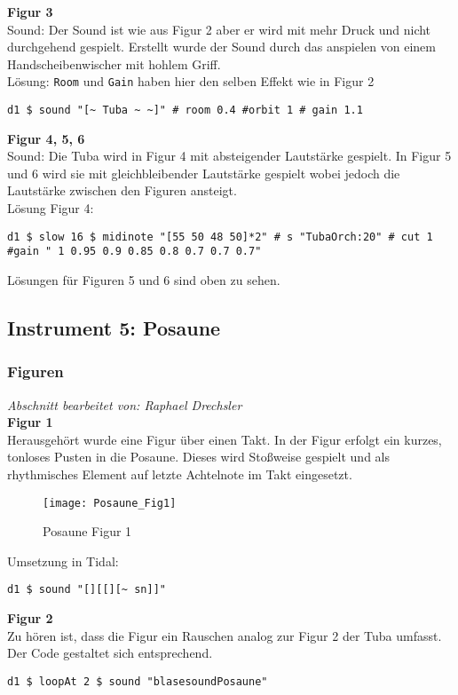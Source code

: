 \documentclass[
10pt, %
a4paper, %
oneside, %
headinclude,footinclude, %
BCOR5mm, %
]{scrartcl}
\begin{document}
\noindent\textbf{Figur 3}\\
Sound: Der Sound ist wie aus Figur 2 aber er wird mit mehr Druck und nicht durchgehend gespielt. Erstellt wurde der Sound durch das anspielen von einem Handscheibenwischer mit hohlem Griff.\\
Lösung: \verb|Room| und \verb|Gain| haben hier den selben Effekt wie in Figur 2
\begin{lstlisting}
d1 $ sound "[~ Tuba ~ ~]" # room 0.4 #orbit 1 # gain 1.1
\end{lstlisting}
\noindent\textbf{Figur 4, 5, 6}\\
Sound: Die Tuba wird in Figur 4 mit absteigender Lautstärke gespielt. In Figur 5 und 6 wird sie mit gleichbleibender Lautstärke gespielt wobei jedoch die Lautstärke
zwischen den Figuren ansteigt.\\
Lösung Figur 4:
\begin{lstlisting}
d1 $ slow 16 $ midinote "[55 50 48 50]*2" # s "TubaOrch:20" # cut 1 #gain " 1 0.95 0.9 0.85 0.8 0.7 0.7 0.7"
\end{lstlisting}
Lösungen für Figuren 5 und 6 sind oben zu sehen.

\subsection{Instrument 5: Posaune}
\subsubsection{Figuren}
\textit{Abschnitt bearbeitet von: Raphael Drechsler}\\

\noindent\textbf{Figur 1}\\
Herausgehört wurde eine Figur über einen Takt. In der Figur erfolgt ein kurzes, tonloses Pusten in die Posaune. Dieses wird Stoßweise gespielt und als rhythmisches Element auf letzte Achtelnote im Takt eingesetzt.
\begin{figure}[h]
	\centering 
	\texttt{[image: Posaune\_Fig1]} 
	\caption{Posaune Figur 1}
\end{figure}

\noindent Umsetzung in Tidal:
\begin{lstlisting}
d1 $ sound "[][[][~ sn]]"
\end{lstlisting}


\noindent\textbf{Figur 2}\\
Zu hören ist, dass die Figur ein Rauschen analog zur Figur 2 der Tuba umfasst. Der Code gestaltet sich entsprechend.
\begin{lstlisting}
d1 $ loopAt 2 $ sound "blasesoundPosaune"
\end{lstlisting}
\end{document}
